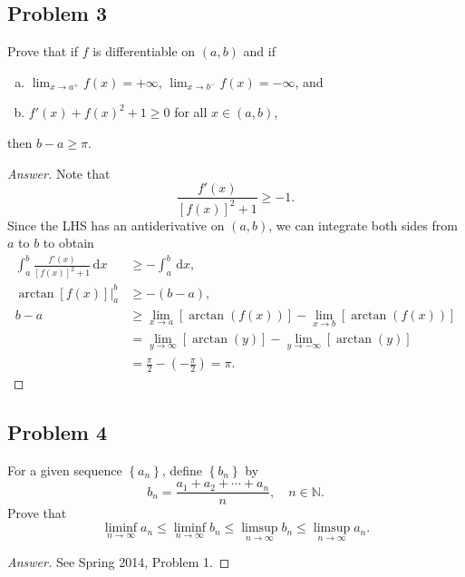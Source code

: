 \documentclass[12pt]{article}
\newcommand{\n}{\mathbb{N}}
\newcommand\paren[1]{\left( #1 \right)}
\newcommand\setb[1]{\left \{ #1 \right \}}
\newcommand{\sqbrack}[1]{\left [ #1 \right ]}
\theoremstyle{definition}
\begin{document}
\subsection{Problem 3 \texorpdfstring{\cite{Ryan}}{}}
Prove that if $f$ is differentiable on $(a,b)$ and if 
\begin{enumerate}[(a)]
    \item $\lim_{x \to a^+} f(x) = + \infty$, $\lim_{x \to b^-} f(x) = -\infty$, and 
    \item $f'(x) + f(x)^2 + 1 \geq 0$ for all $x \in (a,b)$, 
\end{enumerate}
then $b - a \geq \pi$.
\begin{proof}[Answer]
    Note that 
    \[
        \frac{f'(x)}{\sqbrack{f(x)}^2 + 1} \geq -1.
    \]
    Since the LHS has an antiderivative on $(a,b)$, we can integrate both sides from $a$ to $b$ to obtain
    \begin{align*}
        \int_a^b \frac{f'(x)}{\sqbrack{f(x)}^2 + 1} \, \mathrm{d}x & \geq -\int_a^b \, \mathrm{d}x , \\
        \arctan \sqbrack{ f(x) } \Big|_a^b & \geq -(b-a) , \\
        b - a & \geq \lim\limits_{x \to a} \sqbrack{ \arctan \paren{ f(x) } } - \lim\limits_{x \to b} \sqbrack{ \arctan \paren{ f(x) } } \\
        & = \lim\limits_{y \to \infty} \sqbrack{ \arctan(y) } - \lim\limits_{y \to -\infty} \sqbrack{ \arctan(y) } \\
        & = \frac{\pi}{2} - \paren{ -\frac{\pi}{2} } = \pi.
    \end{align*}
\end{proof}
\subsection{Problem 4}
For a given sequence $\setb{ a_n }$, define $\setb{ b_n }$ by 
\[
    b_n = \frac{a_1 + a_2 + \dotsb + a_n}{n}, \quad n \in \n.
\]
Prove that 
\[
    \liminf\limits_{n \to \infty} a_n \leq \liminf\limits_{n \to \infty} b_n \leq \limsup\limits_{n \to \infty} b_n \leq \limsup\limits_{n \to \infty} a_n.
\]
\begin{proof}[Answer]
    See Spring 2014, Problem 1.
\end{proof}
\end{document}
